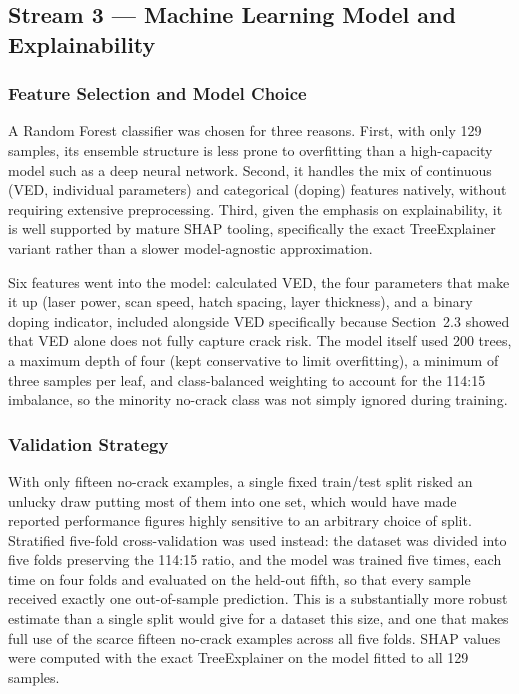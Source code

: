 \documentclass[a4paper]{article}
\begin{document}
\subsection{Stream 3 --- Machine Learning Model and Explainability}
\subsubsection{Feature Selection and Model Choice}
A Random Forest classifier \citep{breiman2001} was chosen for three reasons. First, with only 129 samples, its ensemble structure is less prone to overfitting than a high-capacity model such as a deep neural network. Second, it handles the mix of continuous (VED, individual parameters) and categorical (doping) features natively, without requiring extensive preprocessing. Third, given the emphasis on explainability, it is well supported by mature SHAP tooling, specifically the exact TreeExplainer variant rather than a slower model-agnostic approximation.

Six features went into the model: calculated VED, the four parameters that make it up (laser power, scan speed, hatch spacing, layer thickness), and a binary doping indicator, included alongside VED specifically because Section~2.3 showed that VED alone does not fully capture crack risk. The model itself used 200 trees, a maximum depth of four (kept conservative to limit overfitting), a minimum of three samples per leaf, and class-balanced weighting to account for the 114:15 imbalance, so the minority no-crack class was not simply ignored during training.

\subsubsection{Validation Strategy}
With only fifteen no-crack examples, a single fixed train/test split risked an unlucky draw putting most of them into one set, which would have made reported performance figures highly sensitive to an arbitrary choice of split. Stratified five-fold cross-validation was used instead: the dataset was divided into five folds preserving the 114:15 ratio, and the model was trained five times, each time on four folds and evaluated on the held-out fifth, so that every sample received exactly one out-of-sample prediction. This is a substantially more robust estimate than a single split would give for a dataset this size, and one that makes full use of the scarce fifteen no-crack examples across all five folds. SHAP values were computed with the exact TreeExplainer \citep{lundberg2017} on the model fitted to all 129 samples.
\end{document}
